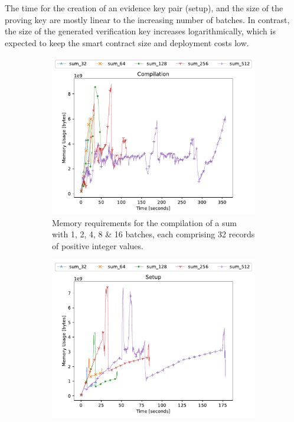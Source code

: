 The time for the creation of an evidence key pair (setup), and the size of the proving key are mostly linear to the increasing number of batches. In contrast, the size of the generated verification key increases logarithmically, which is expected to keep the smart contract size and deployment costs low.

\begin{figure}[h]
    \centering
    \begin{subfigure}[t]{0.49\textwidth}
        \centering
        \includegraphics[width=1\textwidth]{benchmarks/compilation.pdf}
        \caption{Memory requirements for the compilation of a sum with 1, 2, 4, 8 \& 16 batches, each comprising 32 records of positive integer values.}
        \label{fig:y equals x}
    \end{subfigure}
    \hfill
    \begin{subfigure}[t]{0.49\textwidth}
        \centering
        \includegraphics[width=1\textwidth]{benchmarks/setup.pdf}

\end{subfigure}
\end{figure}
